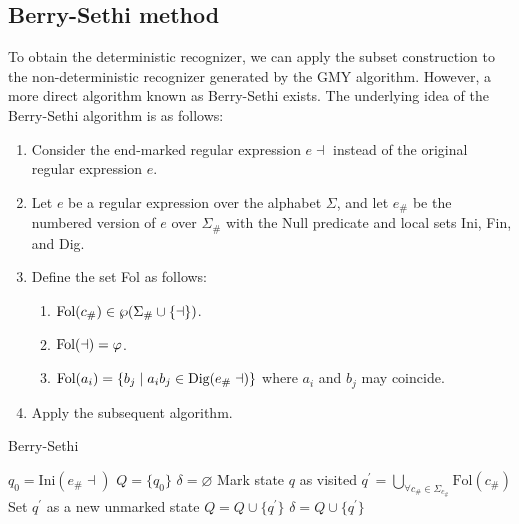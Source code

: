 \subsection{Berry-Sethi method}
To obtain the deterministic recognizer, we can apply the subset construction to the non-deterministic recognizer generated by the GMY algorithm. 
However, a more direct algorithm known as Berry-Sethi exists.
The underlying idea of the Berry-Sethi algorithm is as follows:
\begin{enumerate}
    \item Consider the end-marked regular expression $e \dashv$ instead of the original regular expression $e$.
    \item Let $e$ be a regular expression over the alphabet $\Sigma$, and let $e_{\#}$ be the numbered version of $e$ over $\Sigma_{\#}$ with the Null predicate and local sets Ini, Fin, and Dig.
    \item Define the set Fol as follows:
        \begin{enumerate}
            \item $\textnormal{Fol}(c_{\#}) \in \wp (\Sigma_{\#} \cup \{\dashv\})$. 
            \item $\textnormal{Fol}(\dashv)=\varphi$.
            \item $\textnormal{Fol}(a_i)=\{b_j\mid a_ib_j \in \textnormal{Dig}(e_{\#}\dashv)\}$ where $a_i$ and $b_j$ may coincide. 
        \end{enumerate} 
    \item Apply the subsequent algorithm.
\end{enumerate}
\begin{algorithm}[H]
    \caption{Berry-Sethi}
        \begin{algorithmic}[1]
            \State $q_0 = \text{Ini}(e_{\#} \dashv)$
            \State $Q = \{q_0\}$
            \State $\delta = \varnothing$
                \State Mark state $q$ as visited
                    \State $q^{\prime} = \bigcup_{\forall c_{\#} \in \Sigma_{c_{\#}}}\text{Fol}(c_{\#})$
                            \State Set $q^{\prime}$ as a new unmarked state
                            \State $Q = Q \cup \{q^{\prime}\}$
                        \EndIf
                        \State $\delta = Q \cup \{q^{\prime}\}$
                    \EndIf
                \EndFor
            \EndWhile
        \end{algorithmic}
\end{algorithm}
